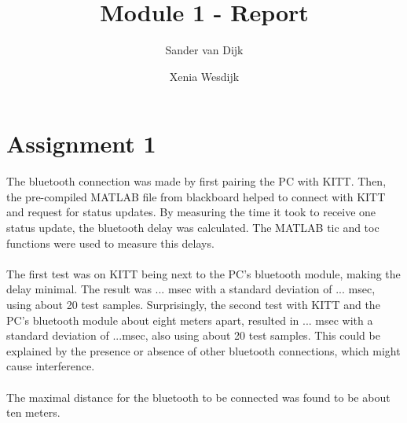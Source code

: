 \documentclass[final]{scrreprt} %
\title{Module 1 - Report}
\author{Sander {van Dijk} \and Xenia {Wesdijk}}
\begin{document}
\chapter{Assignment 1}
The bluetooth connection was made by first pairing the PC with KITT. Then, the pre-compiled MATLAB file from blackboard helped to connect with KITT and request for status updates. By measuring the time it took to receive one status update, the bluetooth delay was calculated. The MATLAB tic and toc functions were used to measure this delays.
\\ \\
The first test was on KITT being next to the PC's bluetooth module, making the delay minimal. The result was ... msec with a standard deviation of ... msec, using about 20 test samples. Surprisingly, the second test with KITT and the PC's bluetooth module about eight meters apart, resulted in ... msec with a standard deviation of ...msec, also using about 20 test samples. This could be explained by the presence or absence of other bluetooth connections, which might cause interference.
\\ \\
The maximal distance for the bluetooth to be connected was found to be about ten meters.
\end{document}
